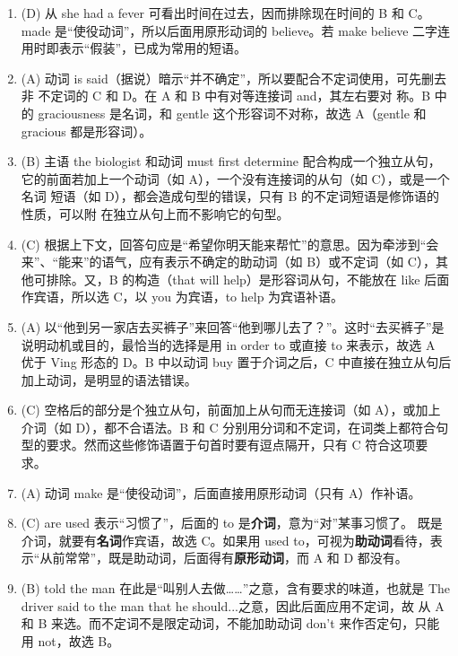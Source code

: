 \begin{enumerate}
\item (D) 从 she had a fever 可看出时间在过去，因而排除现在时间的 B 和 C。made 是“使役动词”，所以后面用原形动词的 believe。若 make believe 二字连用时即表示“假装”，已成为常用的短语。

\item (A) 动词 is said（据说）暗示“并不确定”，所以要配合不定词使用，可先删去非
  不定词的 C 和 D。在 A 和 B 中有对等连接词 and，其左右要对
  称。B 中的 graciousness 是名词，和 gentle 这个形容词不对称，故选 A（gentle
  和 gracious 都是形容词）。

\item (B) 主语 the biologist 和动词 must first determine 配合构成一个独立从句，
  它的前面若加上一个动词（如 A），一个没有连接词的从句（如 C），或是一个名词
  短语（如 D），都会造成句型的错误，只有 B 的不定词短语是修饰语的性质，可以附
  在独立从句上而不影响它的句型。
\item (C) 根据上下文，回答句应是“希望你明天能来帮忙”的意思。因为牵涉到“会来”、“能来”的语气，应有表示不确定的助动词（如 B）或不定词（如 C），其他可排除。又，B 的构造（that will help）是形容词从句，不能放在 like 后面作宾语，所以选 C，以 you 为宾语，to help 为宾语补语。

\item (A) 以“他到另一家店去买裤子”来回答“他到哪儿去了？”。这时“去买裤子”是说明动机或目的，最恰当的选择是用 in order to 或直接 to 来表示，故选 A 优于 Ving 形态的 D。B 中以动词 buy 置于介词之后，C 中直接在独立从句后加上动词，是明显的语法错误。


\item  (C) 空格后的部分是个独立从句，前面加上从句而无连接词（如 A），或加上介词（如 D），都不合语法。B 和 C 分别用分词和不定词，在词类上都符合句型的要求。然而这些修饰语置于句首时要有逗点隔开，只有 C 符合这项要求。

\item (A) 动词 make 是“使役动词”，后面直接用原形动词（只有 A）作补语。

\item (C) are used 表示“习惯了”，后面的 to 是\textbf{介词}，意为“对”某事习惯了。
  既是介词，就要有\textbf{名词}作宾语，故选 C。如果用 used to，可视为\textbf{助动词}看待，表
  示“从前常常”，既是助动词，后面得有\textbf{原形动词}，而 A 和 D 都没有。

\item (B) told the man 在此是“叫别人去做……”之意，含有要求的味道，也就是 The
  driver said to the man that he should...之意，因此后面应用不定词，故
  从 A 和 B 来选。而不定词不是限定动词，不能加助动词 don’t 来作否定句，只能
  用 not，故选 B。


\end{enumerate}
